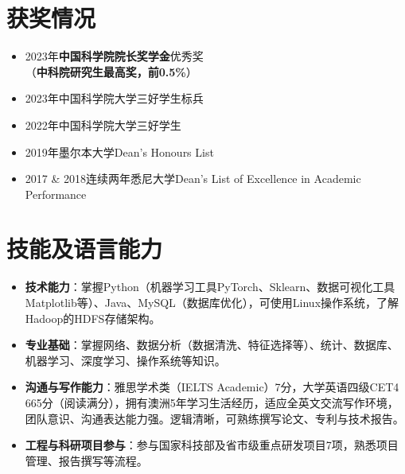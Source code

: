 \documentclass[UTF8,letterpaper,11pt]{article}
\begin{document}

\section{\textbf{获奖情况}}
\vspace{-5mm}
\begin{multicols}{2}
\begin{itemize}
  \setlength\itemsep{1.2pt}
  \item 2023年\textbf{中国科学院院长奖学金}优秀奖\\（\textbf{中科院研究生最高奖，前0.5\%}）
  \item 2023年中国科学院大学三好学生标兵
  \item 2022年中国科学院大学三好学生
  \item 2019年墨尔本大学Dean's Honours List
  \item 2017 \& 2018连续两年悉尼大学Dean's List of Excellence in Academic Performance
\end{itemize}
\end{multicols}




\section{\textbf{技能及语言能力}}

\begin{itemize}
  \setlength\itemsep{2.0pt}
  \item \textbf{技术能力}：掌握Python（机器学习工具PyTorch、Sklearn、数据可视化工具Matplotlib等）、Java、MySQL（数据库优化），可使用Linux操作系统，了解Hadoop的HDFS存储架构。
  \item \textbf{专业基础}：掌握网络、数据分析（数据清洗、特征选择等）、统计、数据库、机器学习、深度学习、操作系统等知识。
  \item \textbf{沟通与写作能力}：雅思学术类（IELTS Academic）7分，大学英语四级CET4 665分（阅读满分），拥有澳洲5年学习生活经历，适应全英文交流写作环境，团队意识、沟通表达能力强。逻辑清晰，可熟练撰写论文、专利与技术报告。
  \item \textbf{工程与科研项目参与}：参与国家科技部及省市级重点研发项目7项，熟悉项目管理、报告撰写等流程。
\end{itemize}


\end{document}
